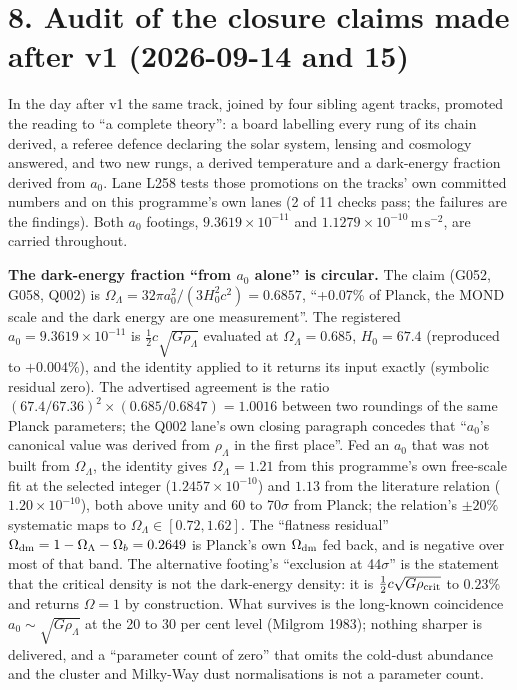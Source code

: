\documentclass[
  11pt,
]{article}
\begin{document}
\section{8. Audit of the closure claims made after v1 (2026-09-14 and
15)}\label{audit-of-the-closure-claims-made-after-v1-2026-09-14-and-15}

In the day after v1 the same track, joined by four sibling agent tracks,
promoted the reading to ``a complete theory'': a board labelling every
rung of its chain derived, a referee defence declaring the solar system,
lensing and cosmology answered, and two new rungs, a derived temperature
and a dark-energy fraction derived from \(a_0\). Lane L258 tests those
promotions on the tracks' own committed numbers and on this programme's
own lanes (2 of 11 checks pass; the failures are the findings). Both
\(a_0\) footings, \(9.3619\times10^{-11}\) and
\(1.1279\times10^{-10}\,\mathrm{m\,s^{-2}}\), are carried throughout.

\textbf{The dark-energy fraction ``from \(a_0\) alone'' is circular.}
The claim (G052, G058, Q002) is
\(\Omega_\Lambda = 32\pi a_0^2/(3H_0^2c^2) = 0.6857\), ``+0.07\% of
Planck, the MOND scale and the dark energy are one measurement''. The
registered \(a_0 = 9.3619\times10^{-11}\) is
\(\tfrac12 c\sqrt{G\rho_\Lambda}\) evaluated at
\(\Omega_\Lambda = 0.685\), \(H_0 = 67.4\) (reproduced to \(+0.004\%\)),
and the identity applied to it returns its input exactly (symbolic
residual zero). The advertised agreement is the ratio
\((67.4/67.36)^2 \times (0.685/0.6847) = 1.0016\) between two roundings
of the same Planck parameters; the Q002 lane's own closing paragraph
concedes that ``\(a_0\)'s canonical value was derived from
\(\rho_\Lambda\) in the first place''. Fed an \(a_0\) that was not built
from \(\Omega_\Lambda\), the identity gives \(\Omega_\Lambda = 1.21\)
from this programme's own free-scale fit at the selected integer
(\(1.2457\times10^{-10}\)) and \(1.13\) from the literature relation
(\(1.20\times10^{-10}\)), both above unity and 60 to 70\(\sigma\) from
Planck; the relation's \(\pm20\%\) systematic maps to
\(\Omega_\Lambda \in [0.72, 1.62]\). The ``flatness residual''
\(\Omega_{\rm dm} = 1 - \Omega_\Lambda - \Omega_b = 0.2649\) is Planck's
own \(\Omega_{\rm dm}\) fed back, and is negative over most of that
band. The alternative footing's ``exclusion at 44\(\sigma\)'' is the
statement that the critical density is not the dark-energy density: it
is \(\tfrac12 c\sqrt{G\rho_{\rm crit}}\) to \(0.23\%\) and returns
\(\Omega = 1\) by construction. What survives is the long-known
coincidence \(a_0 \sim \sqrt{G\rho_\Lambda}\) at the 20 to 30 per cent
level (Milgrom 1983); nothing sharper is delivered, and a ``parameter
count of zero'' that omits the cold-dust abundance and the cluster and
Milky-Way dust normalisations is not a parameter count.
\end{document}
